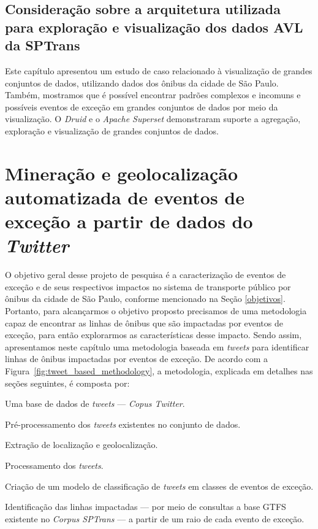 \documentclass[
	12pt,				%
	oneside,			%
	a4paper,			%
	english,			%
	brazil				%
	]{abntex2ppgsi}
\begin{document}
{{\section{Consideração sobre a arquitetura utilizada para exploração e visualização dos dados AVL da SPTrans}
\label{viz_case_cons}

Este capítulo apresentou um estudo de caso relacionado à visualização de grandes conjuntos de dados, utilizando dados dos ônibus da cidade de São Paulo. Também, mostramos que é possível encontrar padrões complexos e incomuns e possíveis eventos de exceção em grandes conjuntos de dados por meio da visualização. O \textit{Druid} e o \textit{Apache Superset} demonstraram suporte a agregação, exploração e visualização de grandes conjuntos de dados. 


\chapter{Mineração e geolocalização automatizada de eventos de exceção a partir de dados do \textit{Twitter}}
\label{exp1}

O objetivo geral desse projeto de pesquisa é a caracterização de eventos de exceção e de seus respectivos impactos no sistema de transporte público por ônibus da cidade de São Paulo, conforme mencionado na Seção \ref{objetivos}. Portanto, para alcançarmos o objetivo proposto precisamos de uma metodologia capaz de encontrar as linhas de ônibus que são impactadas por eventos de exceção, para então explorarmos as características desse impacto. Sendo assim, apresentamos neste capítulo uma metodologia baseada em \textit{tweets} para identificar linhas de ônibus impactadas por eventos de exceção. De acordo com a Figura~\ref{fig:tweet_based_methodology}, a metodologia, explicada em detalhes nas seções seguintes, é composta por:

\begin{enumerate*}
\item Uma base de dados de \textit{tweets} --- \textit{Copus Twitter}.
\item Pré-processamento dos \textit{tweets} existentes no conjunto de dados.
\item Extração de localização e geolocalização.
\item Processamento dos \textit{tweets}.
\item Criação de um modelo de classificação de \textit{tweets} em classes de eventos de exceção.
\item Identificação das linhas impactadas --- por meio de consultas a base GTFS existente no \textit{Corpus SPTrans} --- a partir de um raio de cada evento de exceção.
\end{enumerate*}

}}
\end{document}
